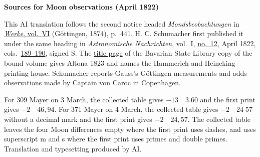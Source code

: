 \clearpage\thispagestyle{empty}
\begin{center}\textbf{Sources for Moon observations (April 1822)}\end{center}
\noindent This AI translation follows the second notice headed \textit{Mondsbeobachtungen} in \href{https://gdz.sub.uni-goettingen.de/id/PPN236007467}{\textit{Werke}, vol.~VI} (Göttingen, 1874), p.~441. H. C. Schumacher first published it under the same heading in \textit{Astronomische Nachrichten}, vol.~I, \href{https://api.digitale-sammlungen.de/iiif/image/v2/bsb10049426_00103/full/1800,/0/default.jpg}{no.~12}, April 1822, cols.~\href{https://api.digitale-sammlungen.de/iiif/image/v2/bsb10049426_00109/full/1800,/0/default.jpg}{189--190}, signed S. The \href{https://api.digitale-sammlungen.de/iiif/image/v2/bsb10049426_00005/full/1800,/0/default.jpg}{title page} of the Bavarian State Library copy of the bound volume gives Altona 1823 and names the Hammerich and Heineking printing house. Schumacher reports Gauss’s Göttingen measurements and adds observations made by Captain von Caroc in Copenhagen.
\par\smallskip\noindent For 309 Mayer on 3 March, the collected table gives $-13\quad3.60$ and the first print gives $-2\quad46{,}94$. For 371 Mayer on 4 March, the collected table gives $-2\quad24\;57$ without a decimal mark and the first print gives $-2\quad24{,}57$. The collected table leaves the four Moon differences empty where the first print uses dashes, and uses superscript m and s where the first print uses primes and double primes. Translation and typesetting produced by AI.
\clearpage
